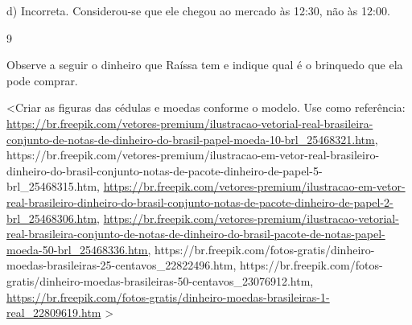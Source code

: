 \begin{escolha}
\begin{escolha}
{{{{{{{{d) Incorreta. Considerou-se que ele chegou ao mercado às 12:30, não às 12:00.

\num{9}

Observe a seguir o dinheiro que Raíssa tem e indique qual é o brinquedo que ela pode comprar.

\textless{}Criar as figuras das cédulas e moedas conforme o modelo. Use
como referência:
\url{https://br.freepik.com/vetores-premium/ilustracao-vetorial-real-brasileira-conjunto-de-notas-de-dinheiro-do-brasil-papel-moeda-10-brl_25468321.htm},
https://br.freepik.com/vetores-premium/ilustracao-em-vetor-real-brasileiro-dinheiro-do-brasil-conjunto-notas-de-pacote-dinheiro-de-papel-5-brl\_25468315.htm,
\url{https://br.freepik.com/vetores-premium/ilustracao-em-vetor-real-brasileiro-dinheiro-do-brasil-conjunto-notas-de-pacote-dinheiro-de-papel-2-brl_25468306.htm},
\url{https://br.freepik.com/vetores-premium/ilustracao-vetorial-real-brasileira-conjunto-de-notas-de-dinheiro-do-brasil-pacote-de-notas-papel-moeda-50-brl_25468336.htm,}
https://br.freepik.com/fotos-gratis/dinheiro-moedas-brasileiras-25-centavos\_22822496.htm,
https://br.freepik.com/fotos-gratis/dinheiro-moedas-brasileiras-50-centavos\_23076912.htm,
\url{https://br.freepik.com/fotos-gratis/dinheiro-moedas-brasileiras-1-real_22809619.htm}
\textgreater{}

}}}}}}}}
\end{escolha}
\end{escolha}
